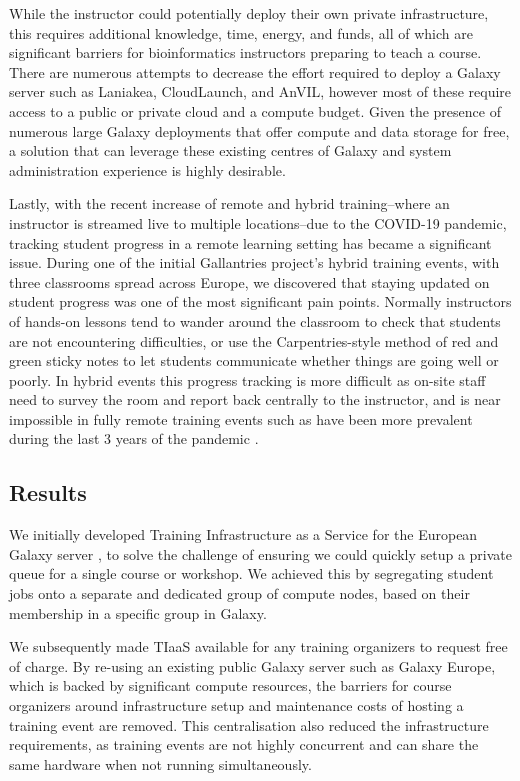 While the instructor could potentially deploy their own private infrastructure, this requires additional knowledge, time, energy, and funds, all of which are significant barriers for bioinformatics instructors preparing to teach a course. There are numerous attempts to decrease the effort required to deploy a Galaxy server such as Laniakea\cite{Tangaro_2020}, CloudLaunch\cite{Afgan_2019}, and AnVIL\cite{Schatz_2022}, however most of these require access to a public or private cloud and a compute budget. Given the presence of numerous large Galaxy deployments that offer compute and data storage for free, a solution that can leverage these existing centres of Galaxy and system administration experience is highly desirable.

Lastly, with the recent increase of remote and hybrid training--where an instructor is streamed live to multiple locations--due to the COVID-19 pandemic, tracking student progress in a remote learning setting has became a significant issue. During one of the initial Gallantries project's \cite{gallantries} hybrid training events, with three classrooms spread across Europe, we discovered that staying updated on student progress was one of the most significant pain points. Normally instructors of hands-on lessons tend to wander around the classroom to check that students are not encountering difficulties, or use the Carpentries-style \cite{thecarpentries,Wilson2016} method of red and green sticky notes to let students communicate whether things are going well or poorly. In hybrid events this progress tracking is more difficult as on-site staff need to survey the room and report back centrally to the instructor, and is near impossible in fully remote training events such as have been more prevalent during the last 3 years of the pandemic \cite{Serrano_Solano_2021}.

\subsection*{Results}
We initially developed Training Infrastructure as a Service for the European Galaxy server \cite{usegalaxyeu}, to solve the challenge of ensuring we could quickly setup a private queue for a single course or workshop. We achieved this by segregating student jobs onto a separate and dedicated group of compute nodes, based on their membership in a specific group in Galaxy.

We subsequently made TIaaS available for any training organizers to request free of charge. By re-using an existing public Galaxy server such as Galaxy Europe, which is backed by significant compute resources, the barriers for course organizers around infrastructure setup and maintenance costs of hosting a training event are removed. This centralisation also reduced the infrastructure requirements, as training events are not highly concurrent and can share the same hardware when not running simultaneously.

